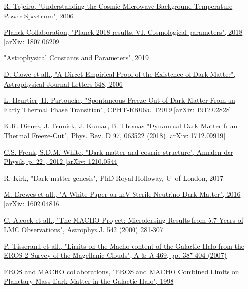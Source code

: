 \documentclass[a4paper, 10pt, openright]{report}
\begin{document}
\begin{thebibliography}{1}
\href{https://www.roe.ac.uk/ifa/postgrad/pedagogy/2006_tojeiro.pdf}{R. Tojeiro,
"Understanding the Cosmic Microwave Background Temperature Power Spectrum",
2006
}

\href{https://arxiv.org/abs/1807.06209}{Planck Collaboration, 
"Planck 2018 results. VI. Cosmological parameters", 2018 [arXiv: 1807.06209]
}

\href{http://pdg.lbl.gov/2019/reviews/rpp2018-rev-astrophysical-constants.pdf}{
"Astrophysical Constants and Parameters", 
2019
}

\href{https://iopscience.iop.org/article/10.1086/508162}{D. Clowe et all.,
"A Direct Empirical Proof of the Existence of Dark Matter",
Astrophysical Journal Letters 648, 2006
}

\href{https://arxiv.org/abs/1912.02828}{L. Heurtier, H. Partouche,
"Spontaneous Freeze Out of Dark Matter From an Early Thermal Phase Transition",
CPHT-RR065.112019 [arXiv: 1912.02828]}

\href{https://arxiv.org/pdf/1712.09919.pdf}{K.R. Dienes, J. Fennick, J. Kumar, B. Thomas
"Dynamical Dark Matter from Thermal Freeze-Out",
Phys. Rev. D 97, 063522 (2018) [arXiv: 1712.09919]
}

\href{https://arxiv.org/pdf/1210.0544.pdf}{C.S. Frenk, S.D.M. White,
"Dark matter and cosmic structure",
Annalen der Physik, p. 22 , 2012 [arXiv: 1210.0544]
}

\href{http://inspirehep.net/record/1683379/files/fulltext.pdf}{R. Kirk,
"Dark matter genesis", PhD Royal Holloway, U. of London, 2017}

\href{https://arxiv.org/pdf/1602.04816.pdf}{M. Drewes et all.,
"A White Paper on keV Sterile Neutrino Dark Matter",
2016 [arXiv: 1602.04816]
}

\href{https://arxiv.org/pdf/astro-ph/0001272}{C. Alcock et all.,
"The MACHO Project: Microlensing Results from 5.7 Years of LMC Observations",
	Astrophys.J. 542 (2000) 281-307
}

\href{https://www.aanda.org/articles/aa/pdf/2007/26/aa6017-06.pdf}{P. Tisserand et all.,
"Limits on the Macho content of the Galactic Halo from the EROS-2 Survey of the Magellanic Clouds",
A \& A 469, pp. 387-404 (2007)
}

\href{https://arxiv.org/abs/astro-ph/9803082}{EROS and MACHO collaborations,
"EROS and MACHO Combined Limits on Planetary Mass Dark Matter in the Galactic Halo",
1998
}


\end{thebibliography}
\end{document}
